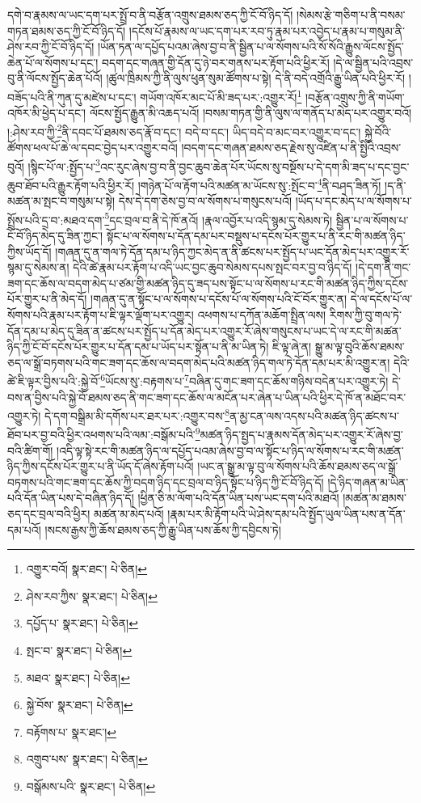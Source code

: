 དགེ་བ་རྣམས་ལ་ཡང་དག་པར་སྤྲོ་བ་ནི་བརྩོན་འགྲུས་ཐམས་ཅད་ཀྱི་ངོ་བོ་ཉིད་དོ། །སེམས་རྩེ་གཅིག་པ་ནི་བསམ་གཏན་ཐམས་ཅད་ཀྱི་ངོ་བོ་ཉིད་དོ། །དངོས་པོ་རྣམས་ལ་ཡང་དག་པར་རབ་ཏུ་རྣམ་པར་འབྱེད་པ་རྣམ་པ་གསུམ་ནི་ཤེས་རབ་ཀྱི་ངོ་བོ་ཉིད་དོ། །ཡོན་ཏན་ལ་དཔྱོད་པའམ་ཞེས་བྱ་བ་ནི་སྦྱིན་པ་ལ་སོགས་པའི་སོ་སོའི་རྒྱུས་ལོངས་སྤྱོད་ཆེན་པོ་ལ་སོགས་པ་དང་། བདག་དང་གཞན་གྱི་དོན་དུ་ཉེ་བར་གནས་པར་རྟོག་པའི་ཕྱིར་རོ། །དེ་ལ་སྦྱིན་པའི་འབྲས་བུ་ནི་ལོངས་སྤྱོད་ཆེན་པོའོ། །ཚུལ་ཁྲིམས་ཀྱི་ནི་ལུས་ཕུན་སུམ་ཚོགས་པ་སྟེ། དེ་ནི་བདེ་འགྲོའི་རྒྱུ་ཡིན་པའི་ཕྱིར་རོ། །བཟོད་པའི་ནི་ཀུན་དུ་མཛེས་པ་དང་། གཡོག་འཁོར་མང་པོ་མི་ཟད་པར་:འགྱུར་རོ།\footnote{འགྱུར་བའོ།  སྣར་ཐང་།  པེ་ཅིན། } །བརྩོན་འགྲུས་ཀྱི་ནི་གཡོག་འཁོར་མི་ཕྱེད་པ་དང་། ལོངས་སྤྱོད་རྒྱུན་མི་འཆད་པའོ། །བསམ་གཏན་གྱི་ནི་ལུས་ལ་གནོད་པ་མེད་པར་འགྱུར་བའོ། །:ཤེས་རབ་ཀྱི་\footnote{ཤེས་རབ་ཀྱིས་  སྣར་ཐང་།  པེ་ཅིན། }ནི་དབང་པོ་ཐམས་ཅད་རྣོ་བ་དང་། བདེ་བ་དང་། ཡིད་བདེ་བ་མང་བར་འགྱུར་བ་དང་། སྐྱེ་བོའི་ཚོགས་ཕལ་པོ་ཆེ་ལ་དབང་བྱེད་པར་འགྱུར་བའོ། །བདག་དང་གཞན་ཐམས་ཅད་རྗེས་སུ་འཛིན་པ་ནི་སྤྱིའི་འབྲས་བུའོ། །སྙིང་པོ་ལ་:སྤྱོད་པ་\footnote{དཔྱོད་པ་  སྣར་ཐང་།  པེ་ཅིན། }འང་རུང་ཞེས་བྱ་བ་ནི་བྱང་ཆུབ་ཆེན་པོར་ཡོངས་སུ་བསྔོས་པ་དེ་དག་མི་ཟད་པ་དང་བྱང་ཆུབ་ཐོབ་པའི་རྒྱུར་རྟོག་པའི་ཕྱིར་རོ། །གཉེན་པོ་ལ་རྟོག་པའི་མཚན་མ་ཡོངས་སུ་:སྤོང་བ་\footnote{སྤང་བ་  སྣར་ཐང་།  པེ་ཅིན། }ནི་བཤད་ཟིན་ཏོ། །ད་ནི་མཚན་མ་སྤང་བ་གསུམ་པ་སྟེ། དེས་དེ་དག་ཅེས་བྱ་བ་ལ་སོགས་པ་གསུངས་པའོ། །ཡོད་པ་དང་མེད་པ་ལ་སོགས་པ་སྤྲོས་པའི་དྲ་བ་:མཐའ་དག་\footnote{མཐའ་  སྣར་ཐང་།  པེ་ཅིན། }དང་བྲལ་བ་ནི་དེ་ཁོ་ནའོ། །རྣལ་འབྱོར་པ་འདི་སྙམ་དུ་སེམས་ཏེ། སྦྱིན་པ་ལ་སོགས་པ་ངོ་བོ་ཉིད་མེད་དུ་ཟིན་ཀྱང་། སྟོང་པ་ལ་སོགས་པ་དོན་དམ་པར་བསྡུས་པ་དངོས་པོར་གྱུར་པ་ནི་རང་གི་མཚན་ཉིད་ཀྱིས་ཡོད་དོ། །གཞན་དུ་ན་གལ་ཏེ་དོན་དམ་པ་ཉིད་ཀྱང་མེད་ན་ནི་ཚངས་པར་སྤྱོད་པ་ཡང་དོན་མེད་པར་འགྱུར་རོ་སྙམ་དུ་སེམས་ན། དེའི་ཚེ་རྣམ་པར་རྟོག་པ་འདི་ཡང་བྱང་ཆུབ་སེམས་དཔས་སྤང་བར་བྱ་བ་ཉིད་དོ། །དེ་དག་ནི་གང་ཟག་དང་ཆོས་ལ་བདག་མེད་པ་ཙམ་གྱི་མཚན་ཉིད་དུ་ཟད་པས་སྟོང་པ་ལ་སོགས་པ་རང་གི་མཚན་ཉིད་ཀྱིས་དངོས་པོར་གྱུར་པ་ནི་མེད་དོ། །གཞན་དུ་ན་སྟོང་པ་ལ་སོགས་པ་དངོས་པོ་ལ་སོགས་པའི་ངོ་བོར་གྱུར་ན། དེ་ལ་དངོས་པོ་ལ་སོགས་པའི་རྣམ་པར་རྟོག་པ་ཇི་ལྟར་ལྡོག་པར་འགྱུར། འཕགས་པ་དཀོན་མཆོག་སྤྲིན་ལས། རིགས་ཀྱི་བུ་གལ་ཏེ་དོན་དམ་པ་མེད་དུ་ཟིན་ན་ཚངས་པར་སྤྱོད་པ་དོན་མེད་པར་འགྱུར་རོ་ཞེས་གསུངས་པ་ཡང་དེ་ལ་རང་གི་མཚན་ཉིད་ཀྱི་ངོ་བོ་དངོས་པོར་གྱུར་པ་དོན་དམ་པ་ཡོད་པར་སྟོན་པ་ནི་མ་ཡིན་ཏེ། ཇི་ལྟ་ཞེ་ན། སྒྱུ་མ་ལྟ་བུའི་ཆོས་ཐམས་ཅད་ལ་སྒྲོ་བཏགས་པའི་གང་ཟག་དང་ཆོས་ལ་བདག་མེད་པའི་མཚན་ཉིད་གལ་ཏེ་དོན་དམ་པར་མི་འགྱུར་ན། དེའི་ཚེ་ཇི་ལྟར་བྱིས་པའི་:སྐྱེ་བོ་\footnote{སྐྱེ་བོས་  སྣར་ཐང་།  པེ་ཅིན། }ཡོངས་སུ་:བརྟགས་པ་\footnote{བརྟོགས་པ་  སྣར་ཐང་། }བཞིན་དུ་གང་ཟག་དང་ཆོས་གཉིས་བདེན་པར་འགྱུར་ཏེ། དེ་བས་ན་བྱིས་པའི་སྐྱེ་བོ་ཐམས་ཅད་ནི་གང་ཟག་དང་ཆོས་ལ་མངོན་པར་ཞེན་པ་ཡིན་པའི་ཕྱིར་དེ་ཁོ་ན་མཐོང་བར་འགྱུར་ཏེ། དེ་དག་བསྒྲིམ་མི་དགོས་པར་ཐར་པར་:འགྱུར་བས་\footnote{འགྲུབ་པས་  སྣར་ཐང་།  པེ་ཅིན། }ན་མྱ་ངན་ལས་འདས་པའི་མཚན་ཉིད་ཚངས་པ་ཐོབ་པར་བྱ་བའི་ཕྱིར་འཕགས་པའི་ལམ་:བསྒོམ་པའི་\footnote{བསྒོམས་པའི་  སྣར་ཐང་།  པེ་ཅིན། }མཚན་ཉིད་སྤྱད་པ་རྣམས་དོན་མེད་པར་འགྱུར་རོ་ཞེས་བྱ་བའི་ཚིག་གོ། །འདི་ལྟ་སྟེ་རང་གི་མཚན་ཉིད་ལ་དཔྱོད་པའམ་ཞེས་བྱ་བ་ལ་སྟོང་པ་ཉིད་ལ་སོགས་པ་རང་གི་མཚན་ཉིད་ཀྱིས་དངོས་པོར་གྱུར་པ་ནི་ཡོད་དོ་ཞེས་རྟོག་པའོ། །ཡང་ན་སྒྱུ་མ་ལྟ་བུ་ལ་སོགས་པའི་ཆོས་ཐམས་ཅད་ལ་སྒྲོ་བཏགས་པའི་གང་ཟག་དང་ཆོས་ཀྱི་བདག་ཉིད་དང་བྲལ་བ་ཉིད་སྟོང་པ་ཉིད་ཀྱི་ངོ་བོ་ཉིད་དོ། །དེ་ཉིད་གཞན་མ་ཡིན་པའི་དོན་ཡིན་པས་དེ་བཞིན་ཉིད་དོ། །ཕྱིན་ཅི་མ་ལོག་པའི་དོན་ཡིན་པས་ཡང་དག་པའི་མཐའོ། །མཚན་མ་ཐམས་ཅད་དང་བྲལ་བའི་ཕྱིར། མཚན་མ་མེད་པའོ། །རྣམ་པར་མི་རྟོག་པའི་ཡེ་ཤེས་དམ་པའི་སྤྱོད་ཡུལ་ཡིན་པས་ན་དོན་དམ་པའོ། །སངས་རྒྱས་ཀྱི་ཆོས་ཐམས་ཅད་ཀྱི་རྒྱུ་ཡིན་པས་ཆོས་ཀྱི་དབྱིངས་ཏེ། 